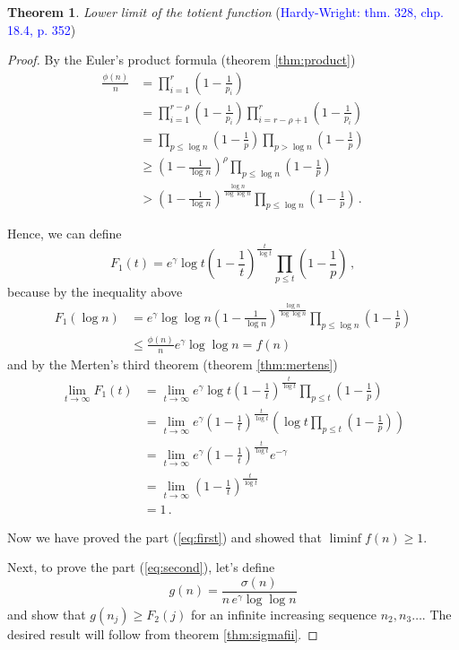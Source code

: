 \documentclass{article}
\theoremstyle{definition}
\newtheorem{theorem}[subsection]{Theorem}
\begin{document}
\begin{theorem}{\emph{Lower limit of the totient function} (\textcolor{blue}{Hardy-Wright: thm. 328, chp. 18.4, p. 352})}
\begin{proof}
By the Euler's product formula (theorem \ref{thm:product})
\begin{align*}
    \frac{\phi(n)}{n} & = \prod_{i=1}^r\left(1-\frac{1}{p_i}\right)\\
    & = \prod_{i=1}^{r-\rho}\left(1-\frac{1}{p_i}\right) \prod_{i=r-\rho+1}^r\left(1-\frac{1}{p_i}\right)\\
    & = \prod_{p\leq\log n}\left(1-\frac{1}{p}\right) \prod_{p>\log n}\left(1-\frac{1}{p}\right)\\
    & \geq \left(1-\frac{1}{\log n}\right)^\rho \prod_{p\leq\log n}\left(1-\frac{1}{p}\right) \\
    & > \left(1-\frac{1}{\log n}\right)^\frac{\log n}{\log \log n} \prod_{p\leq\log n}\left(1-\frac{1}{p}\right)\,.
\end{align*}

Hence, we can define
\begin{equation*}
    F_1(t)=e^\gamma \log t \left(1-\frac{1}{t}\right)^\frac{t}{\log t} \prod_{p\leq t} \left(1-\frac{1}{p}\right)\,,
\end{equation*}
because by the inequality above
\begin{align*}
    F_1(\log n) & = e^\gamma \log \log n \left(1-\frac{1}{\log n}\right)^\frac{\log n}{\log \log n} \prod_{p\leq \log n} \left(1-\frac{1}{p}\right)\\
    & \leq \frac{\phi(n)}{n} e^\gamma \log\log n = f(n)
\end{align*}
and by the Merten's third theorem (theorem \ref{thm:mertens})
\begin{align*}
    \lim_{t \rightarrow \infty} F_1(t) & = \lim_{t \rightarrow \infty} e^\gamma \log t \left(1-\frac{1}{t}\right)^\frac{t}{\log t} \prod_{p\leq t} \left(1-\frac{1}{p}\right)\\
    & = \lim_{t \rightarrow \infty} e^\gamma \left( 1-\frac{1}{t}\right)^\frac{t}{\log t} \left(\log t \prod_{p\leq t} \left(1-\frac{1}{p}\right) \right)\\
    & = \lim_{t \rightarrow \infty} e^\gamma \left( 1-\frac{1}{t}\right)^\frac{t}{\log t} e^{-\gamma}\\
    & = \lim_{t \rightarrow \infty} \left( 1-\frac{1}{t}\right)^\frac{t}{\log t}\\
    & = 1\,.
\end{align*}

Now we have proved the part (\ref{eq:first}) and showed that
$\liminf{f(n)}\geq 1$.

Next, to prove the part (\ref{eq:second}), let's define
\begin{equation*}
    g(n)=\frac{\sigma(n)}{n\,e^\gamma \log\log n}
\end{equation*}
and show that $g(n_j) \geq F_2(j)$ for an infinite increasing sequence $n_2,n_3\dots$. The desired result will follow from theorem \ref{thm:sigmafii}.


\end{proof}
\end{theorem}
\end{document}
